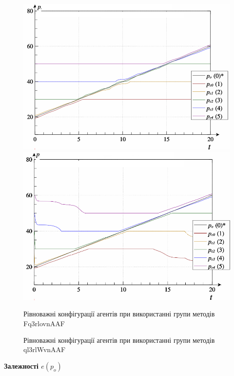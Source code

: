 \documentclass[14pt,handout,utf8]{beamer}
\newlength\DDP
\newcommand{\Xhead}[1]{
 \begin{center}%
      \textbf{#1}%
 \end{center}%
}
\begin{document}
\begin{frame}
  \begin{figure}[htb!]
    \includegraphics[width=\DDP]{../p3/p/ramp/qls-p_t_pi_Fq3rlovnAAF_ramp_xl.png} \hfill
    \includegraphics[width=\DDP]{../p3/p/ramp/qls-p_t_pi_ql3rlWvnAAF_ramp_xl.png}
    \\
    \parbox[t]{\DDP} {
      \caption{Рівноважні конфігурації агентів при використанні групи методів  Fq3rlovnAAF}
    \label{atu:f:qls_ramp_Fq3rlovnAAF}
  }
    \hfill
    \parbox[t]{\DDP} {
      \caption{Рівноважні конфігурації агентів при використанні групи методів ql3rlWvnAAF}
    \label{atu:f:qls_ramp_ql3rlWvnAAF}
  }
  \end{figure}


  \Xhead{Залежності $e(p_o)$}


\end{frame}
\end{document}
